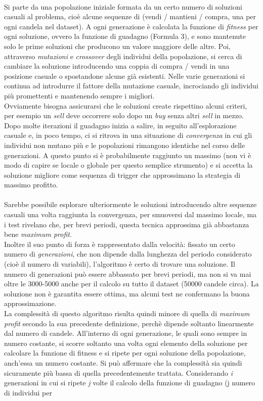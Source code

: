 \documentclass[a4paper,12pt]{report}
\begin{document}
\begin{fig}
\\ Si parte da una popolazione iniziale formata da un certo numero di soluzioni casuali al problema, cioè alcune sequenze di \big[ -1, 0, 1 \big] (vendi / mantieni / compra, una per ogni candela nel dataset). A ogni generazione è calcolata la funzione di \textit{fitness} per ogni soluzione, ovvero la funzione di guadagno (Formula 3), e sono mantenute solo le prime soluzioni che producono un valore maggiore delle altre. Poi, attraverso \textit{mutazioni} e \textit{crossover} degli individui della popolazione, si cerca di cambiare la soluzione introducendo una coppia di compra / vendi in una posizione casuale o spostandone alcune già esistenti. Nelle varie generazioni si continua ad introdurre il fattore della mutazione casuale, incrociando gli individui più promettenti e mantenendo sempre i migliori. \\Ovviamente bisogna assicurarsi che le soluzioni create rispettino alcuni criteri, per esempio un \textit{sell} deve occorrere solo dopo un \textit{buy} senza altri \textit{sell} in mezzo.\\ Dopo molte iterazioni il guadagno inizia a salire, in seguito all'esplorazione casuale e, in poco tempo, ci si ritrova in una situazione di \textit{convergenza} in cui gli individui non mutano più e le popolazioni rimangono identiche nel corso delle generazioni. A questo punto si è probabilmente raggiunto un massimo (non vi è modo di capire se locale o globale per questo semplice strumento) e si accetta la soluzione migliore come sequenza di trigger che approssimano la strategia di massimo profitto.\\~\\ Sarebbe possibile esplorare ulteriormente le soluzioni introducendo altre sequenze casuali una volta raggiunta la convergenza, per smuoversi dal massimo locale, ma i test rivelano che, per brevi periodi, questa tecnica approssima già abbastanza bene \textit{maximum profit}. \\Inoltre il suo punto di forza è rappresentato dalla velocità: fissato un certo numero di \textit{generazioni}, che non dipende dalla lunghezza del periodo considerato (cioè il numero di variabili), l'algoritmo è certo di trovare una soluzione. Il numero di generazioni può essere abbassato per brevi periodi, ma non si va mai oltre le 3000-5000 anche per il calcolo su tutto il dataset (50000 candele circa). La soluzione non è garantita essere ottima, ma alcuni test ne confermano la buona approssimazione.\\ La complessità di questo algoritmo risulta quindi minore di quella di \textit{maximum profit} secondo la sua precedente definizione, perchè dipende soltanto linearmente dal numero di candele. All'interno di ogni generazione, le quali sono sempre in numero costante, si scorre soltanto una volta ogni elemento della soluzione per calcolare la funzione di fitness e si ripete per ogni soluzione della popolazione, anch'essa un numero costante. Si può affermare che la complessità sia quindi sicuramente più bassa di quella precedentemente trattata. Considerando \textit{i} generazioni in cui si ripete \textit{j} volte il calcolo della funzione di guadagno (j numero di individui per 
\end{fig}
\end{document}
